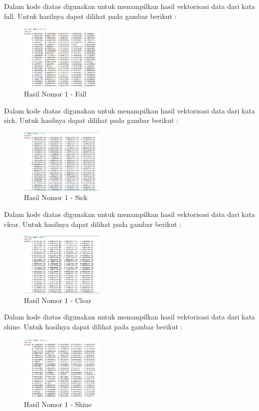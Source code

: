 \begin{enumerate}

Dalam kode diatas digunakan untuk menampilkan hasil vektorisasi data dari kata fall. Untuk hasilnya dapat dilihat pada gambar berikut :
\hfill\break
	\begin{figure}[H]
		\includegraphics[width=4cm]{figures/1174054/5/10.png}
		\centering
		\caption{Hasil Nomor 1 - Fall}
	\end{figure}
	

Dalam kode diatas digunakan untuk menampilkan hasil vektorisasi data dari kata sick. Untuk hasilnya dapat dilihat pada gambar berikut :
\hfill\break
	\begin{figure}[H]
		\includegraphics[width=4cm]{figures/1174054/5/11.png}
		\centering
		\caption{Hasil Nomor 1 - Sick}
	\end{figure}
	

Dalam kode diatas digunakan untuk menampilkan hasil vektorisasi data dari kata clear. Untuk hasilnya dapat dilihat pada gambar berikut :
\hfill\break
	\begin{figure}[H]
		\includegraphics[width=4cm]{figures/1174054/5/12.png}
		\centering
		\caption{Hasil Nomor 1 - Clear}
	\end{figure}
	

Dalam kode diatas digunakan untuk menampilkan hasil vektorisasi data dari kata shine. Untuk hasilnya dapat dilihat pada gambar berikut :
\hfill\break
	\begin{figure}[H]
		\includegraphics[width=4cm]{figures/1174054/5/13.png}
		\centering
		\caption{Hasil Nomor 1 - Shine}
	\end{figure}
	

\end{enumerate}
